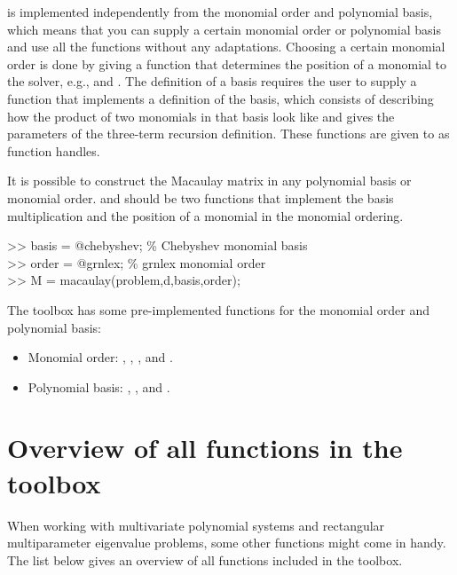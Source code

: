 \documentclass{manual}
\begin{document}
        \maclab\space is implemented independently from the monomial order and polynomial basis, which means that you can supply a certain monomial order or polynomial basis and use all the functions without any adaptations. 
        Choosing a certain monomial order is done by giving a function that determines the position of a monomial to the solver, e.g.,  and .
        The definition of a basis requires the user to supply a function that implements a definition of the basis, which consists of describing how the product of two monomials in that basis look like and gives the parameters of the three-term recursion definition.
        These functions are given to \maclab\space as function handles.
        \begin{code}
            It is possible to construct the Macaulay matrix in any polynomial basis or monomial order. 
             and  should be two functions that implement the basis multiplication and the position of a monomial in the monomial ordering.
            \begin{codeblock}
                >> basis = @chebyshev; \textcolor{comment}{\% Chebyshev monomial basis} \\
                >> order = @grnlex; \textcolor{comment}{\% grnlex monomial order}\\
                >> M = macaulay(problem,d,basis,order);
            \end{codeblock}
        \end{code}
        The toolbox has some pre-implemented functions for the monomial order and polynomial basis:
        \begin{itemize}
            \item Monomial order: , , , and .
            \item Polynomial basis: , , and .
        \end{itemize}

    \section{Overview of all functions in the toolbox}
        \label{sec:manual:otherfunctions}

        When working with multivariate polynomial systems and rectangular multiparameter eigenvalue problems, some other functions might come in handy.
        The list below gives an overview of all functions included in the toolbox.
\end{document}
